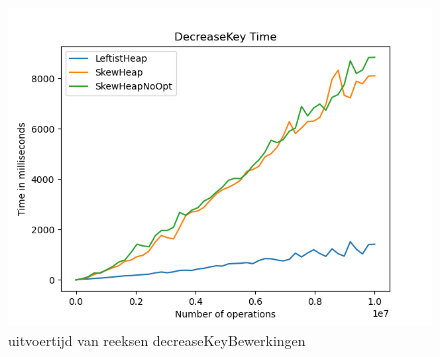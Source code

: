 \documentclass[10pt,a4paper,twoside]{article}
\begin{document}
\begin{figure}
    \centering
    \includegraphics[width=0.85\linewidth]{graphs/DecreaseKeyTime.png}
    \caption{uitvoertijd van reeksen decreaseKeyBewerkingen}
    \label{fig:decreaseKeyBench}
\end{figure}
\end{document}
